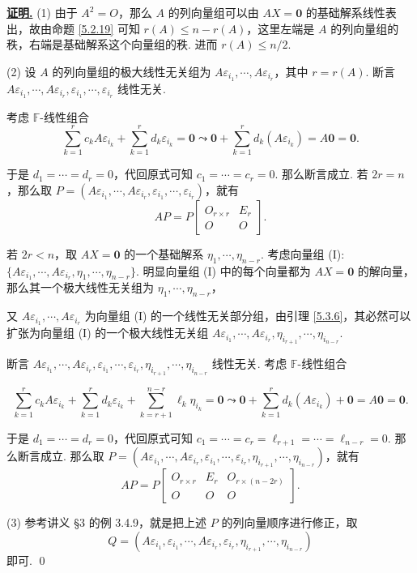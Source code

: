 \documentclass[10pt,openany]{article}
\theoremstyle{thmstyle} %
\theoremstyle{defstyle} %
\theoremstyle{prostyle} %
\theoremstyle{exastyle}
\theoremstyle{remstyle}
\renewenvironment{proof}[1][证明]{\par\underline{\textbf{#1.}} \;\fangsong}{\qed\par}
\newcommand{\F}{\mathbb{F}}
\begin{document}
\begin{proof}
	(1) 由于 \( A^2=O \)，那么 \( A \) 的列向量组可以由 \( AX=\bm{0} \) 的基础解系线性表出，故由命题 \ref{5.2.19} 可知 \( r(A) \leq n-r(A) \)，这里左端是 \( A \) 的列向量组的秩，右端是基础解系这个向量组的秩. 进而 \( r(A) \leq n/2 \).
	
	(2) 设 \( A \) 的列向量组的极大线性无关组为 \( A\varepsilon_{i_1},\cdots,A\varepsilon_{i_r} \)，其中 \( r=r(A) \). 断言 \( A\varepsilon_{i_1},\cdots,A\varepsilon_{i_r},\varepsilon_{i_1},\cdots,\varepsilon_{i_r} \) 线性无关.
	
	考虑 \( \F\)-线性组合 
	\[ \sum_{k=1}^{r} c_kA\varepsilon_{i_k}+ \sum_{k=1}^{r} d_k\varepsilon_{i_k}=\bm{0} \leadsto \bm{0}+ \sum_{k=1}^{r} d_k(A\varepsilon_{i_k})=A\bm{0}=\bm{0}. \]
	
	于是 \( d_1=\cdots=d_r=0 \)，代回原式可知 \( c_1=\cdots=c_r=0 \). 那么断言成立. 若 \( 2r=n \)，那么取 \( P=(A\varepsilon_{i_1},\cdots,A\varepsilon_{i_r},\varepsilon_{i_1},\cdots,\varepsilon_{i_r}) \)，就有
	\[ AP=P\begin{bmatrix}
		O_{r \times r} & E_r \\
		O & O 
	\end{bmatrix}. \]
	
	若 \( 2r<n \)，取 \( AX=\bm{0} \) 的一个基础解系 \( \eta_1,\cdots,\eta_{n-r} \). 考虑向量组 (I): \( \{A\varepsilon_{i_1},\cdots,A\varepsilon_{i_r}, \eta_1,\cdots,\eta_{n-r} \} \). 明显向量组 (I) 中的每个向量都为 \( AX=\bm{0} \) 的解向量，那么其一个极大线性无关组为 \( \eta_1,\cdots,\eta_{n-r} \)，
	
	又 \( A\varepsilon_{i_1},\cdots,A\varepsilon_{i_r} \) 为向量组 (I) 的一个线性无关部分组，由引理 \ref{5.3.6}，其必然可以扩张为向量组 (I) 的一个极大线性无关组 \( A\varepsilon_{i_1},\cdots,A\varepsilon_{i_r},\eta_{i_{r+1}},\cdots,\eta_{i_{n-r}} \).
	
	断言 \( A\varepsilon_{i_1},\cdots,A\varepsilon_{i_r},\varepsilon_{i_1},\cdots,\varepsilon_{i_r}, \eta_{i_{r+1}},\cdots,\eta_{i_{n-r}} \) 线性无关. 考虑 \( \F\)-线性组合
	
	\[ \sum_{k=1}^{r} c_kA\varepsilon_{i_k}+ \sum_{k=1}^{r} d_k\varepsilon_{i_k}+ \sum_{k=r+1}^{n-r} \ell_k \eta_{i_k} =\bm{0} \leadsto \bm{0}+ \sum_{k=1}^{r} d_k(A\varepsilon_{i_k})+ \bm{0} =A\bm{0}=\bm{0}. \]
	
	于是 \( d_1=\cdots=d_r=0 \)，代回原式可知 \( c_1=\cdots=c_r=\ell_{r+1}=\cdots=\ell_{n-r}=0 \). 那么断言成立. 那么取 \( P=(A\varepsilon_{i_1},\cdots,A\varepsilon_{i_r},\varepsilon_{i_1},\cdots,\varepsilon_{i_r},\eta_{i_{r+1}},\cdots,\eta_{i_{n-r}}) \)，就有
	\[ AP=P\begin{bmatrix}
		O_{r \times r} & E_r & O_{r \times (n-2r)} \\
		O & O & O
	\end{bmatrix}. \]
	
	(3) 参考讲义 \S 3 的例 3.4.9，就是把上述 \( P \) 的列向量顺序进行修正，取 
	\[ Q=(A\varepsilon_{i_1},\varepsilon_{i_1},\cdots,A\varepsilon_{i_r},\varepsilon_{i_r},\eta_{i_{r+1}},\cdots,\eta_{i_{n-r}}) \]
	即可.
\end{proof}
\end{document}
